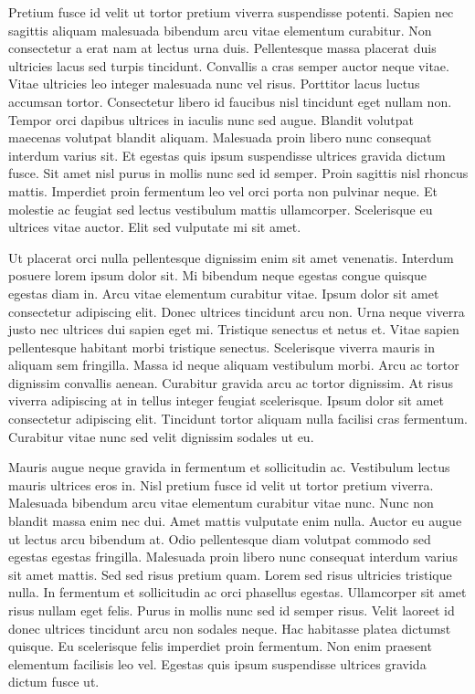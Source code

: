 \documentclass[11pt,a4paper]{article}
\begin{document}
Pretium fusce id velit ut tortor pretium viverra suspendisse potenti. Sapien nec sagittis aliquam malesuada bibendum arcu vitae elementum curabitur. Non consectetur a erat nam at lectus urna duis. Pellentesque massa placerat duis ultricies lacus sed turpis tincidunt. Convallis a cras semper auctor neque vitae. Vitae ultricies leo integer malesuada nunc vel risus. Porttitor lacus luctus accumsan tortor. Consectetur libero id faucibus nisl tincidunt eget nullam non. Tempor orci dapibus ultrices in iaculis nunc sed augue. Blandit volutpat maecenas volutpat blandit aliquam. Malesuada proin libero nunc consequat interdum varius sit. Et egestas quis ipsum suspendisse ultrices gravida dictum fusce. Sit amet nisl purus in mollis nunc sed id semper. Proin sagittis nisl rhoncus mattis. Imperdiet proin fermentum leo vel orci porta non pulvinar neque. Et molestie ac feugiat sed lectus vestibulum mattis ullamcorper. Scelerisque eu ultrices vitae auctor. Elit sed vulputate mi sit amet.

Ut placerat orci nulla pellentesque dignissim enim sit amet venenatis. Interdum posuere lorem ipsum dolor sit. Mi bibendum neque egestas congue quisque egestas diam in. Arcu vitae elementum curabitur vitae. Ipsum dolor sit amet consectetur adipiscing elit. Donec ultrices tincidunt arcu non. Urna neque viverra justo nec ultrices dui sapien eget mi. Tristique senectus et netus et. Vitae sapien pellentesque habitant morbi tristique senectus. Scelerisque viverra mauris in aliquam sem fringilla. Massa id neque aliquam vestibulum morbi. Arcu ac tortor dignissim convallis aenean. Curabitur gravida arcu ac tortor dignissim. At risus viverra adipiscing at in tellus integer feugiat scelerisque. Ipsum dolor sit amet consectetur adipiscing elit. Tincidunt tortor aliquam nulla facilisi cras fermentum. Curabitur vitae nunc sed velit dignissim sodales ut eu.

Mauris augue neque gravida in fermentum et sollicitudin ac. Vestibulum lectus mauris ultrices eros in. Nisl pretium fusce id velit ut tortor pretium viverra. Malesuada bibendum arcu vitae elementum curabitur vitae nunc. Nunc non blandit massa enim nec dui. Amet mattis vulputate enim nulla. Auctor eu augue ut lectus arcu bibendum at. Odio pellentesque diam volutpat commodo sed egestas egestas fringilla. Malesuada proin libero nunc consequat interdum varius sit amet mattis. Sed sed risus pretium quam. Lorem sed risus ultricies tristique nulla. In fermentum et sollicitudin ac orci phasellus egestas. Ullamcorper sit amet risus nullam eget felis. Purus in mollis nunc sed id semper risus. Velit laoreet id donec ultrices tincidunt arcu non sodales neque. Hac habitasse platea dictumst quisque. Eu scelerisque felis imperdiet proin fermentum. Non enim praesent elementum facilisis leo vel. Egestas quis ipsum suspendisse ultrices gravida dictum fusce ut.
\end{document}
